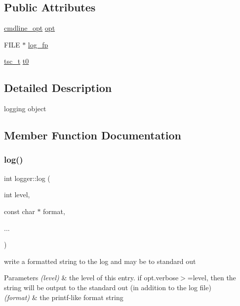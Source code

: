\subsection*{Public Attributes}
\begin{DoxyCompactItemize}
\item 
\hyperlink{structcmdline__opt}{cmdline\+\_\+opt} \hyperlink{structlogger_a0e07e1e52c554084e6c3c06476024b9a}{opt}
\item 
F\+I\+LE $\ast$ \hyperlink{structlogger_ab891d941fb5846a3f8678f1db11c0da9}{log\+\_\+fp}
\item 
\hyperlink{structtsc__t}{tsc\+\_\+t} \hyperlink{structlogger_a6336fd3fffff10df04811a819c1c5a70}{t0}
\end{DoxyCompactItemize}


\subsection{Detailed Description}
logging object 

\subsection{Member Function Documentation}
\mbox{\label{structlogger_aa079e325d6f0279f803843acc2a8c6f5}} 
\subsubsection{\texorpdfstring{log()}{log()}}
{\footnotesize\ttfamily int logger\+::log (\begin{DoxyParamCaption}\item[{int}]{level,  }\item[{const char $\ast$}]{format,  }\item[{}]{... }\end{DoxyParamCaption})\hspace{0.3cm}{\ttfamily [inline]}}



write a formatted string to the log and may be to standard out 


\begin{DoxyParams}{Parameters}
{\em (level)} & the level of this entry. if opt.\+verbose$>$=level, then the string will be output to the standard out (in addition to the log file) \\
\hline
{\em (format)} & the printf-\/like format string \\
\hline
\end{DoxyParams}
\mbox{\label{structlogger_a2d852f1f257849e0abed587814446908}} 
